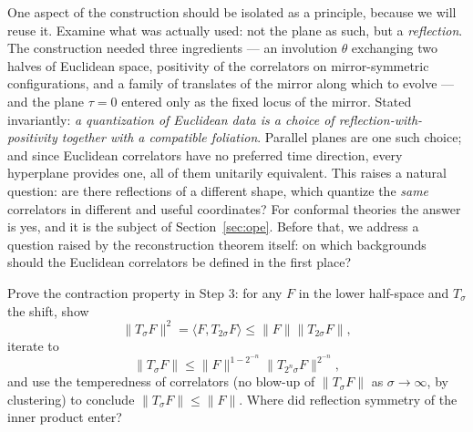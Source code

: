 One aspect of the construction should be isolated as a principle, because
we will reuse it. Examine what was actually used: not the plane as
such, but a \emph{reflection}. The construction needed three ingredients ---
an involution $\theta$ exchanging two halves of Euclidean space, positivity
of the correlators on mirror-symmetric configurations, and a family of
translates of the mirror along which to evolve --- and the plane $\tau = 0$
entered only as the fixed locus of the mirror. Stated invariantly: \emph{a
quantization of Euclidean data is a choice of reflection-with-positivity
together with a compatible foliation}. Parallel planes are one such choice;
and since Euclidean correlators have no preferred time direction, every
hyperplane provides one, all of them unitarily equivalent. This raises a
natural question: are there reflections of a different shape,
which quantize the \emph{same} correlators in different and useful
coordinates? For conformal theories the answer is yes, and it is the subject
of Section~\ref{sec:ope}. Before that, we address a question raised by the
reconstruction theorem itself: on which backgrounds should the Euclidean
correlators be defined in the first place?

\begin{exercise}[medium]
\label{exr:contraction}
Prove the contraction property in Step 3: for any $F$ in the lower half-space
and $T_\sigma$ the shift, show
\begin{equation*}
\|T_\sigma F\|^2
= \langle F, T_{2\sigma}F\rangle
\le \|F\| \|T_{2\sigma}F\|,
\end{equation*}
iterate to
\begin{equation*}
\|T_\sigma F\|
\le \|F\|^{1 - 2^{-n}}\|T_{2^n \sigma}F\|^{2^{-n}},
\end{equation*}
and use the temperedness of correlators (no blow-up of $\|T_\sigma F\|$ as
$\sigma \to \infty$, by clustering) to conclude $\|T_\sigma F\| \le \|F\|$.
Where did reflection symmetry of the inner product enter?
\end{exercise}


